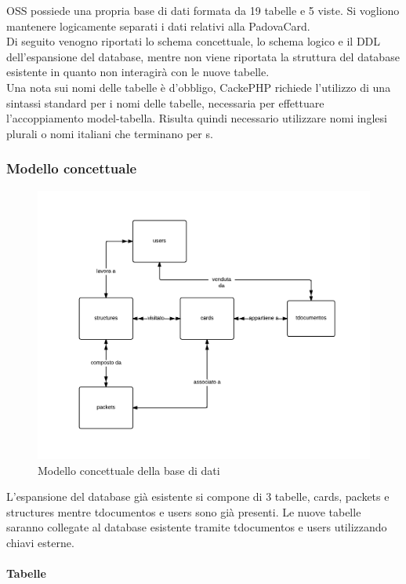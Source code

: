 OSS possiede una propria base di dati formata da 19 tabelle e 5 viste. Si vogliono mantenere logicamente separati i dati relativi alla PadovaCard.\\

Di seguito venogno riportati lo schema concettuale, lo schema logico e il DDL dell'espansione del database, mentre non viene riportata la struttura del database esistente in quanto non interagirà con le nuove tabelle.\\

Una nota sui nomi delle tabelle è d'obbligo, CackePHP richiede l'utilizzo di una sintassi standard per i nomi delle tabelle, necessaria per effettuare l'accoppiamento model-tabella. Risulta quindi necessario utilizzare nomi inglesi plurali o nomi italiani che terminano per s.
\subsubsection{Modello concettuale}
\begin{figure}[H]
\centering
\includegraphics[width=1\textwidth]{images/concettuale.png}
\caption{Modello concettuale della base di dati}
\end{figure}
L'espansione del database già esistente si compone di 3 tabelle, cards, packets e structures mentre tdocumentos e users sono già presenti.
Le nuove tabelle saranno collegate al database esistente tramite tdocumentos e users utilizzando chiavi esterne.\\ \\
\textbf{Tabelle}
